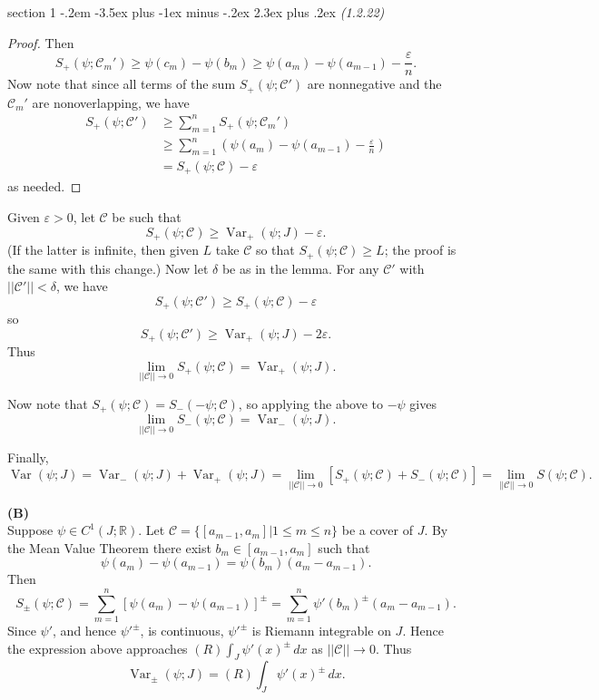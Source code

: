 \documentclass[12pt]{article}
\makeatletter
\theoremstyle{norm}
\newcommand{\R}[0]{\mathbb{R}}
\providecommand{\cal}[1]{\mathcal{#1}}
\renewcommand{\cal}[1]{\mathcal{#1}}
\newcommand{\de}[0]{\delta}
\newcommand{\De}[0]{\Delta}
\newcommand{\ep}[0]{\varepsilon}
\newcommand{\pa}[1]{\left( {#1} \right)}
\newcommand{\subprob}[1]{\noindent\textbf{#1}\\}
\newcommand{\Var}{\operatorname{Var}}
\newenvironment{problem}{\@startsection
       {section}
       {1}
       {-.2em}
       {-3.5ex plus -1ex minus -.2ex}
       {2.3ex plus .2ex}
       {\pagebreak[3]%
       \large\bf\noindent{Problem }
       }
       }
       {%
       }
\makeatother
\begin{document}
\begin{problem} {\it (1.2.22)}
\begin{proof}
Then
\begin{equation}\label{p1-3-2}
S_+(\psi;\cal C_m')\geq \psi(c_m)-\psi(b_m)\geq \psi(a_m)-\psi(a_{m-1})-\frac{\ep}{n}.
\end{equation}
Now note that since all terms of the sum $S_+(\psi;\cal C')$ are nonnegative and the $\cal C_m'$ are nonoverlapping, we have
\begin{align*}
S_+(\psi;\cal C')&\geq \sum_{m=1}^n%
S_+(\psi; \cal C_m')\\
&\geq \sum_{m=1}^n \pa{\psi(a_m)-\psi(a_{m-1})-\frac{\ep}{n}}\\
&=S_+(\psi;\cal C)-\ep
\end{align*}
as needed.
\end{proof}

Given $\ep>0$, let $\cal C$ be such that
\[
S_+(\psi;\cal C)\geq \Var_+(\psi;J)-\ep.
\]
(If the latter is infinite, then given $L$ take $\cal C$ so that $S_+(\psi;\cal C)\geq L$; the proof is the same with this change.)
Now let $\de$ be as in the lemma. For any $\cal C'$ with $||\cal C'||<\de$, we have
\[
S_+(\psi;\cal C')\geq S_+(\psi;\cal C)-\ep
\]
so
\[
S_+(\psi;\cal C')\geq\Var_+(\psi;J)-2\ep.
\]
Thus 
\[\lim_{||\cal C||\to 0}S_+(\psi;\cal C)= \Var_+(\psi;J).\]

Now note that $S_+(\psi;\cal C)=S_-(-\psi;\cal C)$, so applying the above to $-\psi$ gives
\[\lim_{||\cal C||\to 0}S_-(\psi;\cal C)= \Var_-(\psi;J).\]

Finally,
\[
\Var(\psi;J)=\Var_-(\psi;J)+\Var_+(\psi;J)=\lim_{||\cal C||\to 0}[S_+(\psi;\cal C)+S_-(\psi;\cal C)]=\lim_{||\cal C||\to 0} S(\psi;\cal C).
\]

\subprob{(B)}
Suppose $\psi\in C^1(J;\R)$. Let $\cal C=\{[a_{m-1},a_m]|1\leq m\leq n\}$ be a cover of $J$. By the Mean Value Theorem there exist $b_m\in [a_{m-1},a_m]$ such that
\[
\psi(a_m)-\psi(a_{m-1})=\psi(b_m)(a_m-a_{m-1}).
\]
Then
\[
S_{\pm} (\psi;\cal C)
=
\sum_{m=1}^n[\psi(a_m)-\psi(a_{m-1})]^{\pm}
=
\sum_{m=1}^n \psi'(b_m)^{\pm}(a_m-a_{m-1}).
\]
Since $\psi'$, and hence $\psi'^{\pm}$, is continuous, $\psi'^{\pm}$ is Riemann integrable on $J$. Hence the expression above approaches $(R)\int_J \psi'(x)^{\pm}\,dx$ as $||\cal C||\to 0$. Thus
\[\Var_{\pm} (\psi;J)=(R)\int_J \psi'(x)^{\pm}\,dx.\]
\end{problem}
\end{document}
